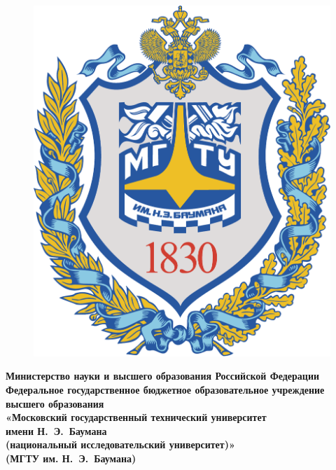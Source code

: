 \begin{titlepage}
	\centering

	\begin{figure}
		\vspace{5mm}
		\hspace{-8mm}
		\includegraphics[width=0.89\linewidth]{inc/img/bmstu-logo}
	\end{figure}

	{\singlespacing\footnotesize\bfseries
		Министерство науки и высшего образования Российской Федерации \\
		Федеральное государственное бюджетное образовательное учреждение \\
		высшего образования \\
		«Московский государственный технический университет \\
		имени Н.~Э.~Баумана \\
		(национальный исследовательский университет)» \\
		(МГТУ им. Н.~Э.~Баумана) \\
	}

	\vspace{-2.2mm}
	\vhrulefill{0.9mm} \\
	\vspace{-7mm}
	\vhrulefill{0.2mm} \\
	\vspace{2mm}


\end{titlepage}
